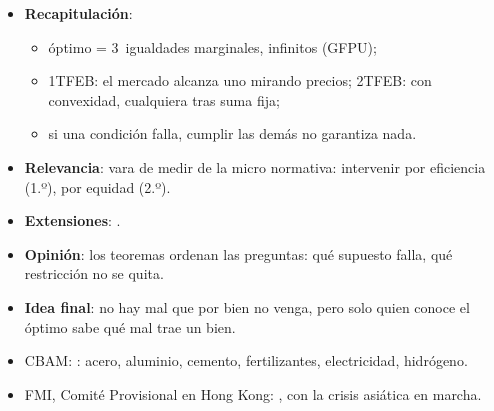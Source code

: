 \documentclass{article}
\begin{document}
\begin{columnas}
\begin{itemize}
\item \textbf{Recapitulación}:
  \begin{itemize}
  \item óptimo = 3~igualdades marginales, infinitos (GFPU);
  \item 1TFEB: el mercado alcanza uno mirando precios; 2TFEB: con convexidad, cualquiera tras suma fija;
  \item si una condición falla, cumplir las demás no garantiza nada.
  \end{itemize}
\item \textbf{Relevancia}: vara de medir de la micro normativa: intervenir por eficiencia (1.º), por equidad (2.º).
\item \textbf{Extensiones}:    .
\item \textbf{Opinión}: los teoremas ordenan las preguntas: qué supuesto falla, qué restricción no se quita.
\item \textbf{Idea final}: no hay mal que por bien no venga, pero solo quien conoce el óptimo sabe qué mal trae un bien.
\end{itemize}

\anexorepaso
{}
\begin{itemize}
\item CBAM: : acero, aluminio, cemento, fertilizantes, electricidad, hidrógeno.
\item FMI, Comité Provisional en Hong Kong: , con la crisis asiática en marcha.
\end{itemize}



\end{columnas}
\end{document}
